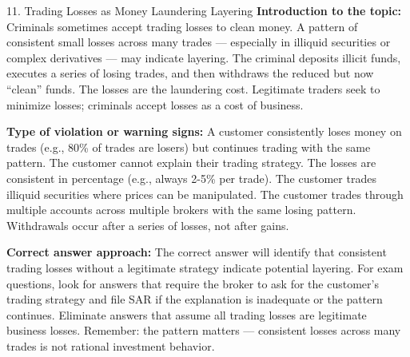 \documentclass[11pt,a4paper]{beamer}
\begin{document}
\begin{frame}{11. Trading Losses as Money Laundering Layering}
\tiny
\noindent\textbf{Introduction to the topic:} Criminals sometimes accept trading losses to clean money. A pattern of consistent small losses across many trades — especially in illiquid securities or complex derivatives — may indicate layering. The criminal deposits illicit funds, executes a series of losing trades, and then withdraws the reduced but now “clean” funds. The losses are the laundering cost. Legitimate traders seek to minimize losses; criminals accept losses as a cost of business.

\vspace{0.1cm}
\noindent\textbf{Type of violation or warning signs:} A customer consistently loses money on trades (e.g., 80\% of trades are losers) but continues trading with the same pattern. The customer cannot explain their trading strategy. The losses are consistent in percentage (e.g., always 2-5\% per trade). The customer trades illiquid securities where prices can be manipulated. The customer trades through multiple accounts across multiple brokers with the same losing pattern. Withdrawals occur after a series of losses, not after gains.

\vspace{0.1cm}
\noindent\textbf{Correct answer approach:} The correct answer will identify that consistent trading losses without a legitimate strategy indicate potential layering. For exam questions, look for answers that require the broker to ask for the customer's trading strategy and file SAR if the explanation is inadequate or the pattern continues. Eliminate answers that assume all trading losses are legitimate business losses. Remember: the pattern matters — consistent losses across many trades is not rational investment behavior.
\end{frame}
\end{document}
